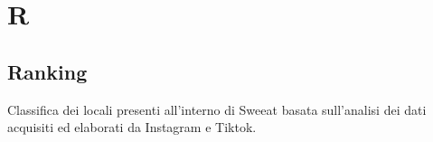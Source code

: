 \section{R}

\subsection{Ranking} Classifica dei locali presenti all’interno di Sweeat basata sull’analisi dei dati acquisiti ed elaborati da Instagram e Tiktok.

\clearpage